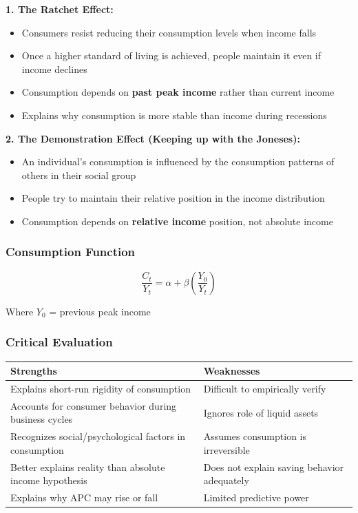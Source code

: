 \documentclass[12pt,a4paper]{article}
\begin{document}
\textbf{1. The Ratchet Effect:}
\begin{itemize}
    \item Consumers resist reducing their consumption levels when income falls
    \item Once a higher standard of living is achieved, people maintain it even if income declines
    \item Consumption depends on \textbf{past peak income} rather than current income
    \item Explains why consumption is more stable than income during recessions
\end{itemize}

\textbf{2. The Demonstration Effect (Keeping up with the Joneses):}
\begin{itemize}
    \item An individual's consumption is influenced by the consumption patterns of others in their social group
    \item People try to maintain their relative position in the income distribution
    \item Consumption depends on \textbf{relative income} position, not absolute income
\end{itemize}

\subsubsection*{Consumption Function}
\begin{equation}
\frac{C_t}{Y_t} = \alpha + \beta\left(\frac{Y_0}{Y_t}\right)
\end{equation}

Where $Y_0$ = previous peak income

\subsubsection*{Critical Evaluation}

\begin{center}
\begin{tabular}{@{}p{6cm}p{6cm}@{}}
\toprule
\textbf{Strengths} & \textbf{Weaknesses} \\
\midrule
Explains short-run rigidity of consumption & Difficult to empirically verify \\
\addlinespace
Accounts for consumer behavior during business cycles & Ignores role of liquid assets \\
\addlinespace
Recognizes social/psychological factors in consumption & Assumes consumption is irreversible \\
\addlinespace
Better explains reality than absolute income hypothesis & Does not explain saving behavior adequately \\
\addlinespace
Explains why APC may rise or fall & Limited predictive power \\
\bottomrule
\end{tabular}
\end{center}
\end{document}
